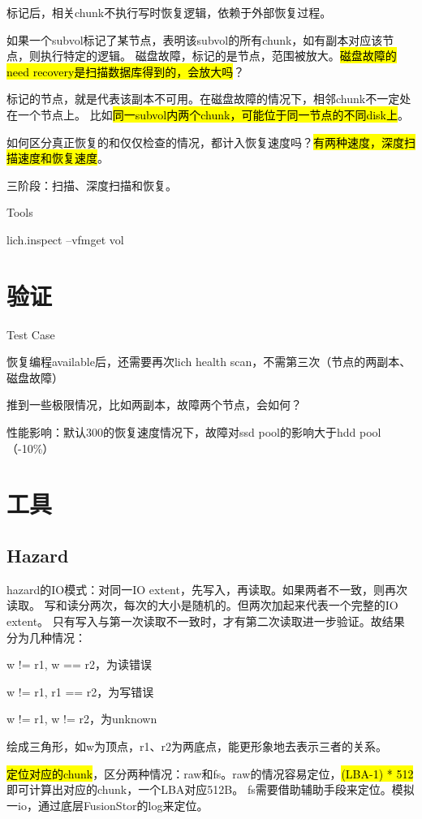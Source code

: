 标记后，相关chunk不执行写时恢复逻辑，依赖于外部恢复过程。

如果一个subvol标记了某节点，表明该subvol的所有chunk，如有副本对应该节点，则执行特定的逻辑。
磁盘故障，标记的是节点，范围被放大。\hl{磁盘故障的need recovery是扫描数据库得到的，会放大吗}？

标记的节点，就是代表该副本不可用。在磁盘故障的情况下，相邻chunk不一定处在一个节点上。
比如\hl{同一subvol内两个chunk，可能位于同一节点的不同disk上}。

如何区分真正恢复的和仅仅检查的情况，都计入恢复速度吗？\hl{有两种速度，深度扫描速度和恢复速度}。

三阶段：扫描、深度扫描和恢复。

Tools
\begin{enumbox}
\item lich.inspect --vfmget vol
\end{enumbox}

\section{验证}

Test Case
\begin{enumbox}
\item 恢复编程available后，还需要再次lich health scan，不需第三次（节点的两副本、磁盘故障）
\item 推到一些极限情况，比如两副本，故障两个节点，会如何？
\item 性能影响：默认300的恢复速度情况下，故障对ssd pool的影响大于hdd pool（-10\%）
\end{enumbox}

\section{工具}

\subsection{Hazard}

hazard的IO模式：对同一IO extent，先写入，再读取。如果两者不一致，则再次读取。
写和读分两次，每次的大小是随机的。但两次加起来代表一个完整的IO extent。
只有写入与第一次读取不一致时，才有第二次读取进一步验证。故结果分为几种情况：
\begin{enumbox}
\item w != r1, w == r2，为读错误
\item w != r1, r1 == r2，为写错误
\item w != r1, w != r2，为unknown
\end{enumbox}

绘成三角形，如w为顶点，r1、r2为两底点，能更形象地去表示三者的关系。

\hl{定位对应的chunk}，区分两种情况：raw和fs。raw的情况容易定位，\hl{(LBA-1) * 512}即可计算出对应的chunk，一个LBA对应512B。
fs需要借助辅助手段来定位。模拟一io，通过底层FusionStor的log来定位。
